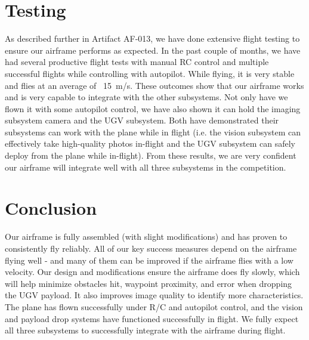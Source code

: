 \documentclass[]{auvsi_doc}
\begin{document}
\section{Testing}
As described further in Artifact AF-013, we have done extensive flight testing to ensure our airframe performs as expected. In the past couple of months, we have had several productive flight tests with manual RC control and multiple successful flights while controlling with autopilot. While flying, it is very stable and flies at an average of ~15\ m/s. These outcomes show that our airframe works and is very capable to integrate with the other subsystems. Not only have we flown it with some autopilot control, we have also shown it can hold the imaging subsystem camera and the UGV subsystem. Both have demonstrated their subsystems can work with the plane while in flight (i.e. the vision subsystem can effectively take high-quality photos in-flight and the UGV subsystem can safely deploy from the plane while in-flight). From these results, we are very confident our airframe will integrate well with all three subsystems in the competition.

\section{Conclusion}
Our airframe is fully assembled (with slight modifications) and has proven to consistently fly reliably. All of our key success measures depend on the airframe flying well - and many of them can be improved if the airframe flies with a low velocity. Our design and modifications ensure the airframe does fly slowly, which will help minimize obstacles hit, waypoint proximity, and error when dropping the UGV payload. It also improves image quality to identify more characteristics. The plane has flown successfully under R/C and autopilot control, and the vision and payload drop systems have functioned successfully in flight. We fully expect all three subsystems to successfully integrate with the airframe during flight.
\end{document}

